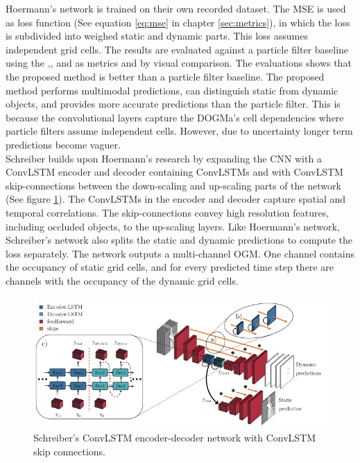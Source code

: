 Hoermann's \cite{hoermann2018dynamic} network is trained on their own recorded dataset. The \gls{MSE} is used as loss function (See equation \ref{eq:mse} in chapter \ref{sec:metrics}), in which the loss is subdivided into weighed static and dynamic parts. This loss assumes independent grid cells. The results are evaluated against a particle filter baseline using the ,, and  as metrics and by visual comparison. The evaluations shows that the proposed method is better than a particle filter baseline. The proposed method performs multimodal predictions, can distinguish static from dynamic objects, and provides more accurate predictions than the particle filter. This is because the convolutional layers capture the DOGMa's cell dependencies where particle filters assume independent cells. However, due to uncertainty longer term predictions become vaguer. \\

Schreiber \cite{schreiber2019long} builds upon Hoermann's \cite{hoermann2018dynamic} research by expanding the \gls{CNN} with a \gls{ConvLSTM} encoder and decoder containing \glspl{ConvLSTM} and with \gls{ConvLSTM} skip-connections between the down-scaling and up-scaling parts of the network (See figure \ref{fig:convlstm_schreiber}). The \glspl{ConvLSTM} in the encoder and decoder capture spatial and temporal correlations. The skip-connections convey high resolution features, including occluded objects, to the up-scaling layers. Like Hoermann's \cite{hoermann2018dynamic} network, Schreiber's \cite{schreiber2019long} network also splits the static and dynamic predictions to compute the loss separately. The network outputs a multi-channel \gls{OGM}. One channel contains the occupancy of static grid cells, and for every predicted time step there are channels with the occupancy of the dynamic grid cells. \\

\begin{figure}[h]
	\centering
	\includegraphics[width=0.8\linewidth]{Figures/Methods/Schreiber_ConvLSTM}
	\caption{Schreiber's \cite{schreiber2019long} \gls{ConvLSTM} encoder-decoder network with \gls{ConvLSTM} skip connections.}
	\label{fig:convlstm_schreiber}
\end{figure}

